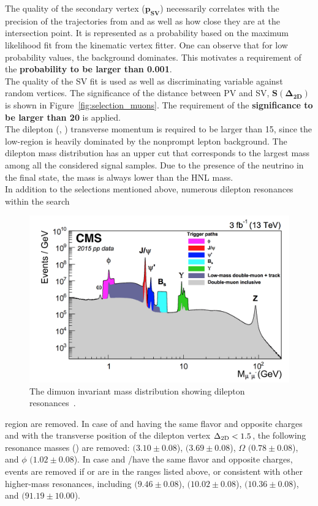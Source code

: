 The quality of the secondary vertex ($\boldsymbol{ p_{SV}}$) necessarily correlates with the precision of the trajectories from \ltwo and \lthree as well as how close they are at the intersection point. It is represented as a probability based on the maximum likelihood fit from the kinematic vertex fitter. One can observe that for low probability values, the background dominates. This motivates a requirement of the \textbf{probability to be larger than 0.001}. \\

The quality of the SV fit is used as well as discriminating variable against random vertices. The significance of the distance between PV and SV, $\boldsymbol{ S(\Delta_{2D})}$ is shown in Figure~\ref{fig:selection_muons}. The requirement of the \textbf{significance to be larger than 20} is applied.\\

The dilepton (\ltwo, \lthree) transverse momentum  is required to be
larger than 15\GeV, since the low-\pt region is heavily dominated by
the nonprompt lepton background.
The dilepton mass \mtwol distribution has an upper cut that
corresponds to the largest mass among all the considered signal
samples. Due to the presence of the neutrino in the final state, the
mass is always lower than the HNL mass.\\

In addition to the selections mentioned above, numerous dilepton
resonances within the search
 \begin{figure}
\centering
\includegraphics[clip,trim=1.2cm 0.1cm 0.8cm 0.3cm, width=.40\textwidth]{Figures/c2/dimuon}
\caption{The dimuon invariant mass distribution showing dilepton resonances~\cite{Sirunyan_2018_muon}.}
\label{fig:c6dimuon}
\end{figure}
 region are removed.
In case of \ltwo and \lthree having the same flavor and opposite
charges and with the transverse position of the dilepton vertex
$\Delta_{\mathrm{2D}}<1.5$\cm, the following resonance masses (\mtwol) are
removed: 
\JPsi $(3.10 \pm 0.08$\GeV), \Pgy $(3.69 \pm 0.08$\GeV), $\Omega$
$(0.78 \pm 0.08$\GeV), and $\phi$ $(1.02 \pm 0.08$\GeV).
In case \lone and \ltwo/\lthree have the same flavor and opposite
charges, events are removed if \mlonetwo or \mlonethree are in the
ranges listed above, or consistent with other higher-mass resonances,
including \PgUa $(9.46 \pm 0.08$\GeV), \PgUb $(10.02 \pm 0.08$\GeV),
\PgUc $(10.36 \pm 0.08$\GeV), and \PZ $(91.19 \pm 10.00$\GeV).

